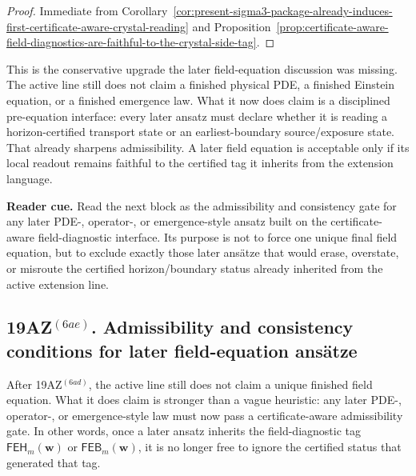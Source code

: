 \begin{proof}
Immediate from Corollary~\ref{cor:present-sigma3-package-already-induces-first-certificate-aware-crystal-reading} and Proposition~\ref{prop:certificate-aware-field-diagnostics-are-faithful-to-the-crystal-side-tag}.
\end{proof}

\begin{remark}
\label{rem:what-this-field-diagnostic-interface-now-buys}
This is the conservative upgrade the later field-equation discussion was missing. The active line still does not claim a finished physical PDE, a finished Einstein equation, or a finished emergence law. What it now does claim is a disciplined pre-equation interface: every later ansatz must declare whether it is reading a horizon-certified transport state or an earliest-boundary source/exposure state. That already sharpens admissibility. A later field equation is acceptable only if its local readout remains faithful to the certified tag it inherits from the extension language.
\end{remark}


\noindent\textbf{Reader cue.} Read the next block as the admissibility and consistency gate for any later PDE-, operator-, or emergence-style ansatz built on the certificate-aware field-diagnostic interface. Its purpose is not to force one unique final field equation, but to exclude exactly those later ansätze that would erase, overstate, or misroute the certified horizon/boundary status already inherited from the active extension line.

\subsection*{19AZ$^{(6ae)}$. Admissibility and consistency conditions for later field-equation ansätze}
\label{sec:admissibility-and-consistency-conditions-for-later-field-equation-ansatze}
After 19AZ$^{(6ad)}$, the active line still does not claim a unique finished field equation. What it does claim is stronger than a vague heuristic: any later PDE-, operator-, or emergence-style law must now pass a certificate-aware admissibility gate. In other words, once a later ansatz inherits the field-diagnostic tag \(\mathsf{FEH}_{m}(\mathbf w)\) or \(\mathsf{FEB}_{m}(\mathbf w)\), it is no longer free to ignore the certified status that generated that tag.

